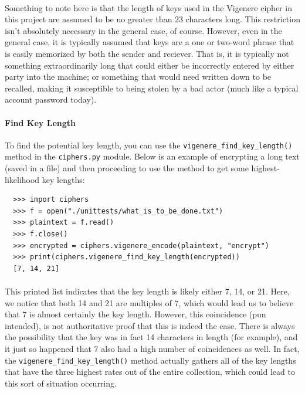 \documentclass[12pt,a4paper]{article}
\begin{document}
\paragraph{}
Something to note here is that the length of keys used in the Vigenere cipher 
in this project are assumed to be no greater than 23 characters long.  This 
restriction isn't absolutely necessary in the general case, of course. 
However, even in the general case, it is typically assumed that keys are a one 
or two-word phrase that is easily memorized by both the sender and reciever.  
That is, it is typically not something extraordinarily long that could either 
be incorrectly entered by either party into the machine; or something that 
would need written down to be recalled, making it susceptible to being stolen 
by a bad actor (much like a typical account password today).

\paragraph{Find Key Length}
To find the potential key length, you can use the
\verb|vigenere_find_key_length()| method in the \verb|ciphers.py| module.  
Below is an example of encrypting a long text (saved in a file) and then 
proceeding to use the method to get some highest-likelihood key lengths:

\begin{verbatim}
  >>> import ciphers
  >>> f = open("./unittests/what_is_to_be_done.txt")
  >>> plaintext = f.read()
  >>> f.close()
  >>> encrypted = ciphers.vigenere_encode(plaintext, "encrypt")
  >>> print(ciphers.vigenere_find_key_length(encrypted))
  [7, 14, 21]
\end{verbatim}

\paragraph{}
This printed list indicates that the key length is likely either 7, 14, or 21. 
Here, we notice that both 14 and 21 are multiples of 7, which would lead us to 
believe that 7 is almost certainly the key length.  However, this coincidence 
(pun intended), is not authoritative proof that this is indeed the case.  There 
is always the possibility that the key was in fact 14 characters in length (for 
example), and it just so happened that 7 also had a high number of coincidences 
as well.  In fact, the \verb|vigenere_find_key_length()| method actually 
gathers all of the key lengths that have the three highest rates out of the 
entire collection, which could lead to this sort of situation occurring.
\end{document}
